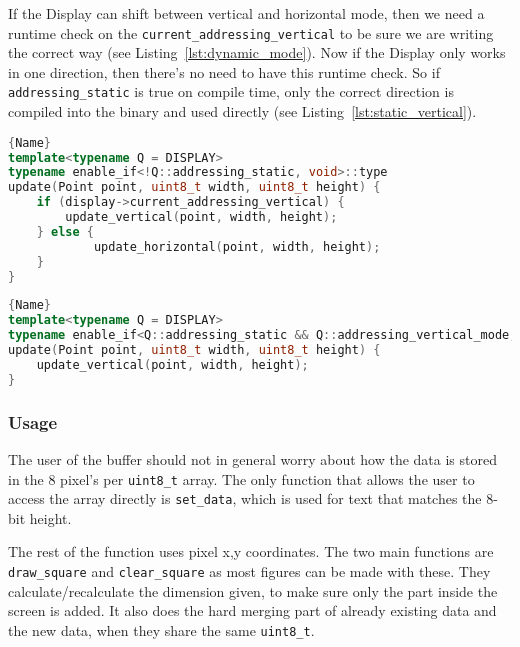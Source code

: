 If the Display can shift between vertical and horizontal mode, then we need a runtime check on the \texttt{current\_addressing\_vertical} to be sure we are writing the correct way (see Listing~\ref{lst:dynamic_mode}). Now if the Display only works in one direction, then there's no need to have this runtime check. So if \texttt{addressing\_static} is true on compile time, only the correct direction is compiled into the binary and used directly (see Listing~\ref{lst:static_vertical}).

\noindent\begin{minipage}[t]{.45\textwidth}
\begin{lstlisting}[caption={Dynamic Mode},label={lst:dynamic_mode},frame=tlrb, language=C++]{Name}
template<typename Q = DISPLAY>
typename enable_if<!Q::addressing_static, void>::type
update(Point point, uint8_t width, uint8_t height) {
    if (display->current_addressing_vertical) {
  	    update_vertical(point, width, height);
  	} else {
  			update_horizontal(point, width, height);
  	}
}
\end{lstlisting}
\end{minipage}\hfill
\begin{minipage}[t]{.45\textwidth}
\begin{lstlisting}[caption={Static Vertical Mode},label={lst:static_vertical},frame=tlrb, language=C++]{Name}
template<typename Q = DISPLAY>
typename enable_if<Q::addressing_static && Q::addressing_vertical_mode, void>::type
update(Point point, uint8_t width, uint8_t height) {
    update_vertical(point, width, height);
}
\end{lstlisting}
\end{minipage}

\subsubsection{Usage}

The user of the buffer should not in general worry about how the data is stored in the 8 pixel's per \texttt{uint8\_t} array. The only function that allows the user to access the array directly is \texttt{set\_data}, which is used for text that matches the 8-bit height.

The rest of the function uses pixel x,y coordinates. The two main functions are \texttt{draw\_square} and \texttt{clear\_square} as most figures can be made with these. They calculate/recalculate the dimension given, to make sure only the part inside the screen is added. It also does the hard merging part of already existing data and the new data, when they share the same \texttt{uint8\_t}.

